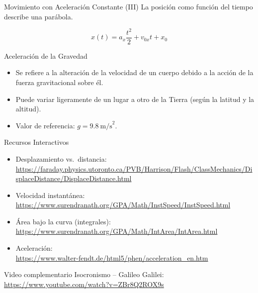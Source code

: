 \documentclass[aspectratio=169,xcolor=dvipsnames]{beamer}
\begin{document}
\begin{frame}{Movimiento con Aceleración Constante (III)}
	La posición como función del tiempo describe una parábola.
	\begin{center}
	\end{center}
	\[
	x(t) = a_x\frac{t^2}{2}+v_{0x}t+x_0
	\]
\end{frame}

\begin{frame}{Aceleración de la Gravedad}
\begin{itemize}
\item Se refiere a la alteración de la velocidad de un cuerpo debido a la acción de la fuerza gravitacional sobre él.
\item Puede variar ligeramente de un lugar a otro de la Tierra (según la latitud y la altitud).
\item Valor de referencia: $g = 9.8\ \text{m/s}^2$.
\end{itemize}
\end{frame}

\begin{frame}{Recursos Interactivos}
\footnotesize
\begin{itemize}
\item Desplazamiento vs.\ distancia:\\ \url{https://faraday.physics.utoronto.ca/PVB/Harrison/Flash/ClassMechanics/DisplaceDistance/DisplaceDistance.html}
\item Velocidad instantánea:\\ \url{https://www.surendranath.org/GPA/Math/InstSpeed/InstSpeed.html}
\item Área bajo la curva (integrales):\\ \url{https://www.surendranath.org/GPA/Math/IntArea/IntArea.html}
\item Aceleración:\\ \url{https://www.walter-fendt.de/html5/phen/acceleration_en.htm}
\end{itemize}
\begin{block}{Video complementario}
\small Isocronismo -- Galileo Galilei: \url{https://www.youtube.com/watch?v=ZBr8Q2ROX9s}
\end{block}
\end{frame}
\end{document}
